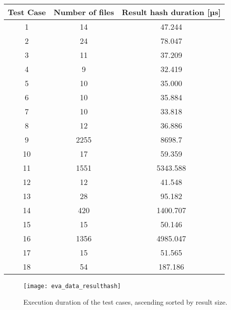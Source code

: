 \documentclass[draft,final]{vutinfth} %
\begin{document}
\begin{itemize}
\begin{table}[]
		\centering
		\begin{tabular}{c|c|c}
			\textbf{Test Case} & \textbf{Number of files} & \textbf{Result hash duration [µs]}  \\ \hline
			1 & 14  & 47.244 \\ \hline 
			2 & 24 & 78.047 \\ \hline
			3 & 11 & 37.209 \\ \hline
			4 & 9 & 32.419 \\ \hline
			5 & 10 & 35.000 \\ \hline
			6 & 10 & 35.884 \\ \hline
			7 & 10 & 33.818 \\ \hline
			8 & 12 & 36.886 \\ \hline
			9 & 2255 & 8698.7 \\ \hline
			10 & 17 & 59.359 \\ \hline
			11 & 1551 & 5343.588 \\ \hline
			12 & 12 & 41.548 \\ \hline
			13 & 28 & 95.182 \\ \hline
			14 & 420 & 1400.707 \\ \hline
			15 & 15 & 50.146 \\ \hline
			16 & 1356 & 4985.047 \\ \hline
			17 & 15 & 51.565 \\ \hline
			18 & 54 & 187.186 \\ 
		\end{tabular}
		\label{Tab:data_result_hash}
	\end{table}
	
	\begin{figure}[h]
		\centering
		\texttt{[image: eva\_data\_resulthash]}
		\caption{Execution duration of the test cases, ascending sorted by result size.}
		\label{fig:evaluation_data_resulthash} %
	\end{figure}
	

\end{itemize}
\end{document}
